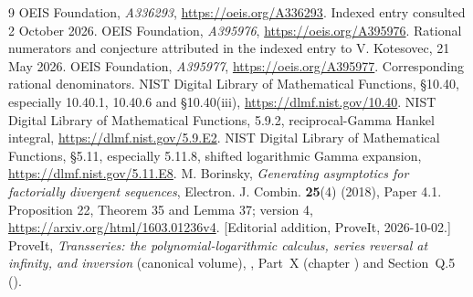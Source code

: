 \documentclass[11pt,letterpaper]{article}
\numberwithin{equation}{section}
\theoremstyle{remark}\newtheorem{remark}[theorem]{Remark}
\begin{document}
\begingroup\small
\begin{thebibliography}{9}
\setlength{\itemsep}{2pt}
 OEIS Foundation, \emph{A336293}, \url{https://oeis.org/A336293}. Indexed entry consulted 2 October 2026.
 OEIS Foundation, \emph{A395976}, \url{https://oeis.org/A395976}. Rational numerators and conjecture attributed in the indexed entry to V. Kotesovec, 21 May 2026.
 OEIS Foundation, \emph{A395977}, \url{https://oeis.org/A395977}. Corresponding rational denominators.
 NIST Digital Library of Mathematical Functions, \S10.40, especially 10.40.1, 10.40.6 and \mbox{\S10.40(iii)}, \url{https://dlmf.nist.gov/10.40}.
 NIST Digital Library of Mathematical Functions, 5.9.2, reciprocal-Gamma Hankel integral, \url{https://dlmf.nist.gov/5.9.E2}.
 NIST Digital Library of Mathematical Functions, \S5.11, especially 5.11.8, shifted logarithmic Gamma expansion, \url{https://dlmf.nist.gov/5.11.E8}.
 M. Borinsky, \emph{Generating asymptotics for factorially divergent sequences}, Electron. J. Combin. \textbf{25}(4) (2018), Paper 4.1. Proposition 22, Theorem 35 and Lemma 37; version 4, \url{https://arxiv.org/html/1603.01236v4}.
 [Editorial addition, ProveIt, 2026-10-02.] ProveIt, \emph{Transseries: the polynomial-logarithmic calculus, series reversal at infinity, and inversion} (canonical volume), , Part~X (chapter ) and Section~Q.5 ().
\end{thebibliography}
\endgroup
\end{document}
